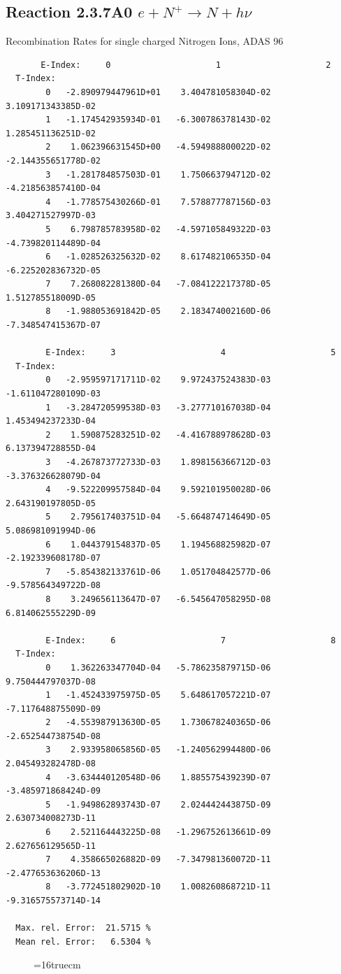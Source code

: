 \documentclass[12pt,dvips]{article}
\begin{document}
\subsection{
Reaction 2.3.7A0  $e + N^{+} \rightarrow N + h\nu$ }
 Recombination Rates for single  charged Nitrogen Ions, ADAS 96

\begin{small}\begin{verbatim}
       E-Index:     0                     1                     2
  T-Index:
        0   -2.890979447961D+01    3.404781058304D-02    3.109171343385D-02
        1   -1.174542935934D-01   -6.300786378143D-02    1.285451136251D-02
        2    1.062396631545D+00   -4.594988800022D-02   -2.144355651778D-02
        3   -1.281784857503D-01    1.750663794712D-02   -4.218563857410D-04
        4   -1.778575430266D-01    7.578877787156D-03    3.404271527997D-03
        5    6.798785783958D-02   -4.597105849322D-03   -4.739820114489D-04
        6   -1.028526325632D-02    8.617482106535D-04   -6.225202836732D-05
        7    7.268082281380D-04   -7.084122217378D-05    1.512785518009D-05
        8   -1.988053691842D-05    2.183474002160D-06   -7.348547415367D-07

        E-Index:     3                     4                     5
  T-Index:
        0   -2.959597171711D-02    9.972437524383D-03   -1.611047280109D-03
        1   -3.284720599538D-03   -3.277710167038D-04    1.453494237233D-04
        2    1.590875283251D-02   -4.416788978628D-03    6.137394728855D-04
        3   -4.267873772733D-03    1.898156366712D-03   -3.376326628079D-04
        4   -9.522209957584D-04    9.592101950028D-06    2.643190197805D-05
        5    2.795617403751D-04   -5.664874714649D-05    5.086981091994D-06
        6    1.044379154837D-05    1.194568825982D-07   -2.192339608178D-07
        7   -5.854382133761D-06    1.051704842577D-06   -9.578564349722D-08
        8    3.249656113647D-07   -6.545647058295D-08    6.814062555229D-09

        E-Index:     6                     7                     8
  T-Index:
        0    1.362263347704D-04   -5.786235879715D-06    9.750444797037D-08
        1   -1.452433975975D-05    5.648617057221D-07   -7.117648875509D-09
        2   -4.553987913630D-05    1.730678240365D-06   -2.652544738754D-08
        3    2.933958065856D-05   -1.240562994480D-06    2.045493282478D-08
        4   -3.634440120548D-06    1.885575439239D-07   -3.485971868424D-09
        5   -1.949862893743D-07    2.024442443875D-09    2.630734008273D-11
        6    2.521164443225D-08   -1.296752613661D-09    2.627656129565D-11
        7    4.358665026882D-09   -7.347981360072D-11   -2.477653636206D-13
        8   -3.772451802902D-10    1.008260868721D-11   -9.316575573714D-14

  Max. rel. Error:  21.5715 %
  Mean rel. Error:   6.5304 %

\end{verbatim}\end{small}
\begin{figure} \label{2.3.7A0}
\epsfxsize=16truecm 
\end{figure}
\newpage
\end{document}
